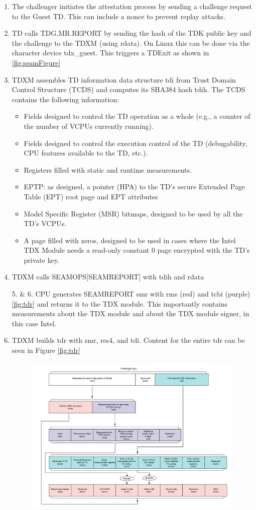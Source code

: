 \begin{enumerate}
\item The challenger initiates the attestation process by sending a challenge request to the Guest TD. This can include a nonce to prevent replay attacks\cite{sardar_formal_2023}.
\item TD calls TDG.MR.REPORT by sending the hash of the TDK public key and the challenge to the TDXM (using rdata). On Linux this can be done via the character device tdx\_guest. This triggers a TDExit as shown in \cref{fig:seamFigure}
\item TDXM assembles TD information data structure tdi from Trust Domain Control Structure (TCDS) and computes its SHA384 hash tdih. The TCDS contains the following information:
\begin{itemize}
    \item Fields designed to control the TD operation as a whole (e.g., a counter of the number of VCPUs currently running). 
    \item Fields designed to control the execution control of the TD (debugability, CPU features available to the TD, etc.). 
    \item Registers filled with static and runtime measurements. 
    \item EPTP: as designed, a pointer (HPA) to the TD’s secure Extended Page Table (EPT) root page and EPT attributes
    \item Model Specific Register (MSR) bitmaps, designed to be used by all the TD’s VCPUs. 
    \item A page filled with zeros, designed to be used in cases where the Intel TDX Module needs a read-only constant 0 page encrypted with the TD’s private key.
\end{itemize}
\item TDXM calls SEAMOPS[SEAMREPORT] with tdih and rdata
\item[5. \& 6.] CPU generates SEAMREPORT smr  with rms (red) and tcbi (purple) \ref{fig:tdr} and returns it to the TDX module. This importantly contains measurements about the TDX module and about the TDX module signer, in this case Intel.
\item TDXM builds tdr with smr, res4, and tdi. Content for the entire tdr can be seen in Figure \ref{fig:tdr}
\begin{figure}
\centering
\includegraphics[width=\textwidth]{figures/tdr.png}

\end{figure}
\end{enumerate}
